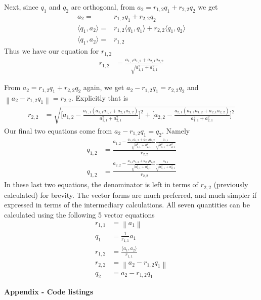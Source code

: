 \documentclass[12pt]{article}
\newcommand{\norm}[1]{\left\lVert#1\right\rVert}
\begin{document}
Next, since $q_1$ and $q_2$ are orthogonal, from $a_2 = r_{1,2}q_1 + r_{2,2}q_2$ we get
\begin{align*}
	a_2 = & r_{1,2}q_1 + r_{2,2}q_2 \\
	\langle q_1,a_2 \rangle = & r_{1,2}\langle q_1, q_1 \rangle + r_{2,2} \langle q_1, q_2 \rangle \\
	\langle q_1,a_2 \rangle = & r_{1,2}
\end{align*}
Thus we have our equation for $r_{1,2}$
\begin{align}
	r_{1,2} & = \frac{a_{1,1}a_{1,2} + a_{2,1}a_{2,2}}{\sqrt{a_{1,1}^2 + a_{2,1}^2}}
\end{align}

From $a_2 = r_{1,2}q_1 + r_{2,2}q_2$ again, we get $a_2 - r_{1,2}q_1 = r_{2,2}q_2$ and $\norm{a_2 - r_{1,2}q_1} = r_{2,2}$. Explicitly that is
\begin{align}
	r_{2,2} & = \sqrt{  \Bigg [ a_{1,2} -  \frac{a_{1,1}(a_{1,1}a_{1,2} + a_{2,1}a_{2,2})}{a_{1,1}^2 + a_{2,1}^2} \Bigg]^2 + \Bigg [ a_{2,2} -  \frac{a_{2,1}(a_{1,1}a_{1,2} + a_{2,1}a_{2,2})}{a_{1,1}^2 + a_{2,1}^2} \Bigg]^2}
\end{align}
Our final two equations come from $a_2 - r_{1,2}q_1 = q_2$. Namely
\begin{align}
	q_{1,2} & = \frac{a_{1,2} - \frac{a_{1,1}a_{1,2} + a_{2,1}a_{2,2}}{\sqrt{a_{1,1}^2 + a_{2,1}^2}}\frac{a_{1,1}}{\sqrt{a_{1,1}^2 + a_{2,1}^2}} }{r_{2,2}} \\
	q_{1,2} & = \frac{a_{2,2} - \frac{a_{1,1}a_{1,2} + a_{2,1}a_{2,2}}{\sqrt{a_{1,1}^2 + a_{2,1}^2}}\frac{a_{2,1}}{\sqrt{a_{1,1}^2 + a_{2,1}^2}} }{r_{2,2}}
\end{align}
In these last two equations, the denominator is left in terms of $r_{2,2}$ (previously calculated) for brevity. The vector forms are much preferred, and much simpler if expressed in terms of the intermediary calculations. All seven quantities can be calculated using the following 5 vector equations
\begin{align*}
	r_{1,1} &= \norm{a_1} \\
	q_1 &= \frac{1}{r_{1,1}}a_1 \\
	r_{1,2} &= \frac{\langle a_1, a_2 \rangle}{r_{1,1}} \\
	r_{2,2} &= \norm{a_2 - r_{1,2}q_1} \\
	q_2 &= a_2 - r_{1,2}q_1
\end{align*}

\bigbreak
\bigbreak

{\hspace{-4 ex} \huge \textbf{Appendix - Code listings}}\bigbreak
\end{document}
